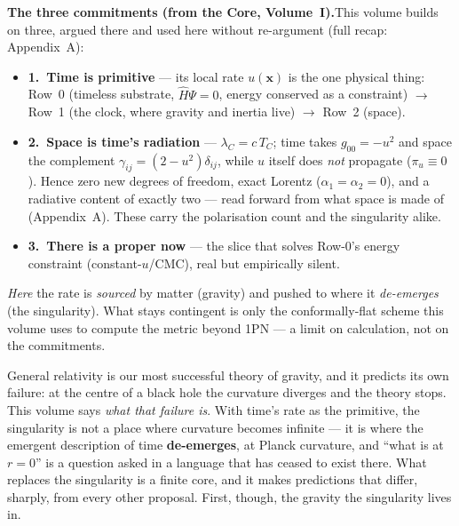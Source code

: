 \documentclass[11pt]{article}
\begin{document}
\begin{tcolorbox}
\textbf{The three commitments (from the Core, Volume~I).}\enspace This volume builds on three, argued there
and used here without re-argument (full recap: Appendix~A):
\begin{itemize}[leftmargin=1.4em,itemsep=1pt,topsep=3pt]
  \item \textbf{1.\ Time is primitive} --- its local rate $u(\mathbf x)$ is the one physical thing:
    Row~0 (timeless substrate, $\hat H\Psi=0$, energy conserved as a constraint) $\to$ Row~1 (the clock,
    where gravity and inertia live) $\to$ Row~2 (space).
  \item \textbf{2.\ Space is time's radiation} --- $\lambda_C=c\,T_C$; time takes $g_{00}=-u^2$ and space
    the complement $\gamma_{ij}=(2-u^2)\delta_{ij}$, while $u$ itself does \emph{not} propagate
    ($\pi_u\equiv0$). Hence zero new degrees of freedom, exact Lorentz ($\alpha_1=\alpha_2=0$), and a
    radiative content of exactly two --- read forward from what space is made of (Appendix~A). These carry
    the polarisation count and the singularity alike.
  \item \textbf{3.\ There is a proper now} --- the slice that solves Row-0's energy constraint
    (constant-$u$/CMC), real but empirically silent.
\end{itemize}
\noindent\emph{Here} the rate is \emph{sourced} by matter (gravity) and pushed to where it \emph{de-emerges}
(the singularity). What stays contingent is only the conformally-flat scheme this volume uses to compute the
metric beyond 1PN --- a limit on calculation, not on the commitments.
\end{tcolorbox}

\medskip
\noindent General relativity is our most successful theory of gravity, and it predicts its own failure:
at the centre of a black hole the curvature diverges and the theory stops. This volume says \emph{what
that failure is}. With time's rate as the primitive, the singularity is not a place where curvature
becomes infinite --- it is where the emergent description of time \textbf{de-emerges}, at Planck
curvature, and ``what is at $r=0$'' is a question asked in a language that has ceased to exist there.
What replaces the singularity is a finite core, and it makes predictions that differ, sharply, from
every other proposal. First, though, the gravity the singularity lives in.
\end{document}
